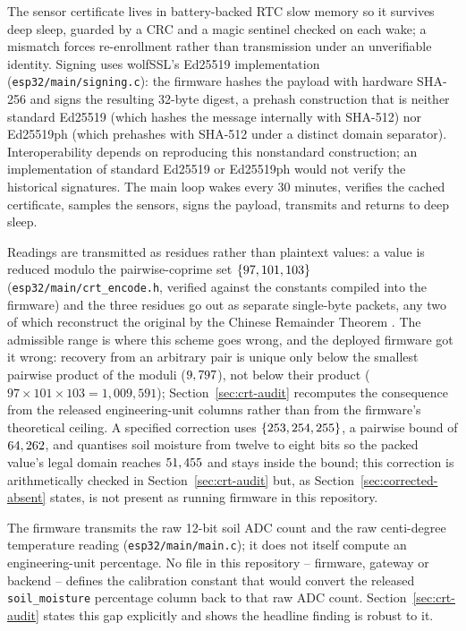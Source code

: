 The sensor certificate lives in battery-backed RTC slow memory so it survives deep sleep, guarded by a CRC and a magic sentinel checked on each wake; a mismatch forces re-enrollment rather than transmission under an unverifiable identity. Signing uses wolfSSL's Ed25519 implementation (\texttt{esp32/main/signing.c}): the firmware hashes the payload with hardware SHA-256 and signs the resulting 32-byte digest, a prehash construction that is neither standard Ed25519 (which hashes the message internally with SHA-512) nor Ed25519ph (which prehashes with SHA-512 under a distinct domain separator). Interoperability depends on reproducing this nonstandard construction; an implementation of standard Ed25519 or Ed25519ph would not verify the historical signatures. The main loop wakes every 30 minutes, verifies the cached certificate, samples the sensors, signs the payload, transmits and returns to deep sleep.

Readings are transmitted as residues rather than plaintext values: a value is reduced modulo the pairwise-coprime set $\{97, 101, 103\}$ (\texttt{esp32/main/crt\_encode.h}, verified against the constants compiled into the firmware) and the three residues go out as separate single-byte packets, any two of which reconstruct the original by the Chinese Remainder Theorem \citep{garner1959residue}. The admissible range is where this scheme goes wrong, and the deployed firmware got it wrong: recovery from an arbitrary pair is unique only below the smallest pairwise product of the moduli ($9,797$), not below their product ($97 \times 101 \times 103 = 1{,}009{,}591$); Section~\ref{sec:crt-audit} recomputes the consequence from the released engineering-unit columns rather than from the firmware's theoretical ceiling. A specified correction uses $\{253, 254, 255\}$, a pairwise bound of $64,262$, and quantises soil moisture from twelve to eight bits so the packed value's legal domain reaches $51,455$ and stays inside the bound; this correction is arithmetically checked in Section~\ref{sec:crt-audit} but, as Section~\ref{sec:corrected-absent} states, is not present as running firmware in this repository.

The firmware transmits the raw 12-bit soil ADC count and the raw centi-degree temperature reading (\texttt{esp32/main/main.c}); it does not itself compute an engineering-unit percentage. No file in this repository -- firmware, gateway or backend -- defines the calibration constant that would convert the released \texttt{soil\_moisture} percentage column back to that raw ADC count. Section~\ref{sec:crt-audit} states this gap explicitly and shows the headline finding is robust to it.

